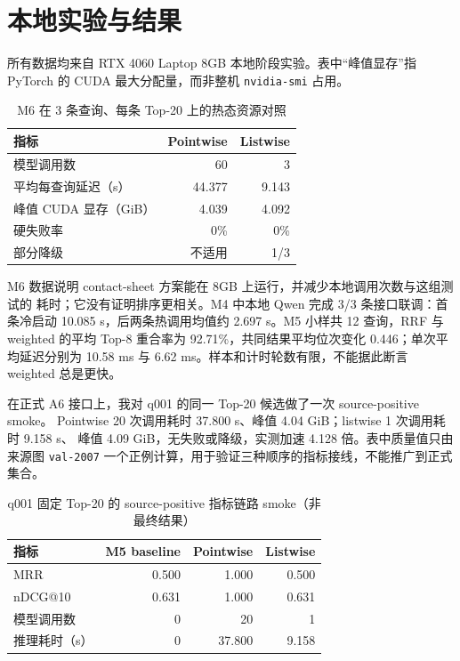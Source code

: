 \documentclass[UTF8,11pt,a4paper]{ctexart}
\begin{document}
\section{本地实验与结果}

所有数据均来自 RTX 4060 Laptop 8GB 本地阶段实验。表中“峰值显存”指 PyTorch 的
CUDA 最大分配量，而非整机 \texttt{nvidia-smi} 占用。

\begin{table}[htbp]
\centering
\small
\caption{M6 在 3 条查询、每条 Top-20 上的热态资源对照}
\begin{tabular}{lrr}
\toprule
指标 & Pointwise & Listwise \\
\midrule
模型调用数 & 60 & 3 \\
平均每查询延迟（s） & 44.377 & 9.143 \\
峰值 CUDA 显存（GiB） & 4.039 & 4.092 \\
硬失败率 & 0\% & 0\% \\
部分降级 & 不适用 & 1/3 \\
\bottomrule
\end{tabular}
\end{table}

M6 数据说明 contact-sheet 方案能在 8GB 上运行，并减少本地调用次数与这组测试的
耗时；它没有证明排序更相关。M4 中本地 Qwen 完成 3/3 条接口联调：首条冷启动
10.085 s，后两条热调用均值约 2.697 s。M5 小样共 12 查询，RRF 与 weighted 的平均
Top-8 重合率为 92.71\%，共同结果平均位次变化 0.446；单次平均延迟分别为 10.58 ms
与 6.62 ms。样本和计时轮数有限，不能据此断言 weighted 总是更快。

在正式 A6 接口上，我对 q001 的同一 Top-20 候选做了一次 source-positive smoke。
Pointwise 20 次调用耗时 37.800 s、峰值 4.04 GiB；listwise 1 次调用耗时 9.158 s、
峰值 4.09 GiB，无失败或降级，实测加速 4.128 倍。表中质量值只由来源图
\texttt{val-2007} 一个正例计算，用于验证三种顺序的指标接线，不能推广到正式集合。

\begin{table}[htbp]
\centering
\small
\caption{q001 固定 Top-20 的 source-positive 指标链路 smoke（非最终结果）}
\begin{tabular}{lrrr}
\toprule
指标 & M5 baseline & Pointwise & Listwise \\
\midrule
MRR & 0.500 & 1.000 & 0.500 \\
nDCG@10 & 0.631 & 1.000 & 0.631 \\
模型调用数 & 0 & 20 & 1 \\
推理耗时（s） & 0 & 37.800 & 9.158 \\
\bottomrule
\end{tabular}
\end{table}
\end{document}
